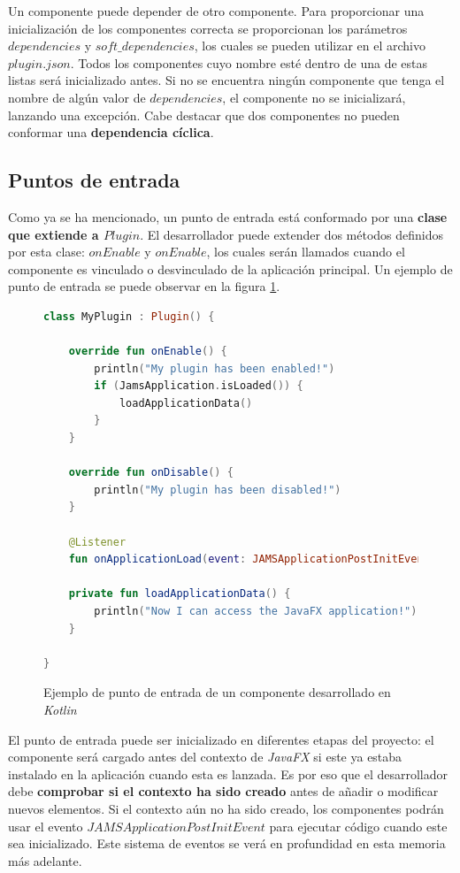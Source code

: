 Un componente puede depender de otro componente.
Para proporcionar una inicialización de los componentes
correcta se proporcionan los parámetros $dependencies$
y $soft\_dependencies$, los cuales se pueden utilizar en
el archivo $plugin.json$.
Todos los componentes cuyo nombre esté dentro de una de estas
listas será inicializado antes.
Si no se encuentra ningún componente que tenga el nombre
de algún valor de $dependencies$, el componente no
se inicializará, lanzando una excepción.
Cabe destacar que dos componentes no pueden conformar
una \textbf{dependencia cíclica}.

\subsection{Puntos de entrada}\label{subsec:puntos-de-entrada}

Como ya se ha mencionado, un punto de entrada está conformado
por una \textbf{clase que extiende a $Plugin$}.
El desarrollador puede extender dos métodos definidos por esta clase:
$onEnable$ y $onEnable$, los cuales serán llamados cuando el
componente es vinculado o desvinculado de la aplicación principal.
Un ejemplo de punto de entrada se puede observar en la figura \ref{fig:entry-point}.

\begin{figure}[h]
    \centering
    \begin{lstlisting}[frame=single,label={lst:entry-point},language=Kotlin]
class MyPlugin : Plugin() {

    override fun onEnable() {
        println("My plugin has been enabled!")
        if (JamsApplication.isLoaded()) {
            loadApplicationData()
        }
    }

    override fun onDisable() {
        println("My plugin has been disabled!")
    }

    @Listener
    fun onApplicationLoad(event: JAMSApplicationPostInitEvent) = loadApplicationData()

    private fun loadApplicationData() {
        println("Now I can access the JavaFX application!")
    }

}
    \end{lstlisting}
    \caption{Ejemplo de punto de entrada de un componente desarrollado en \textit{Kotlin}}
    \label{fig:entry-point}
\end{figure}

\noindent El punto de entrada puede ser inicializado en diferentes
etapas del proyecto: el componente será cargado antes del contexto
de \textit{JavaFX} si este ya estaba instalado en la aplicación
cuando esta es lanzada.
Es por eso que el desarrollador debe \textbf{comprobar si el contexto ha sido creado}
antes de añadir o modificar nuevos elementos.
Si el contexto aún no ha sido creado, los componentes podrán
usar el evento $JAMSApplicationPostInitEvent$ para ejecutar
código cuando este sea inicializado.
Este sistema de eventos se verá en profundidad en esta memoria más adelante.


